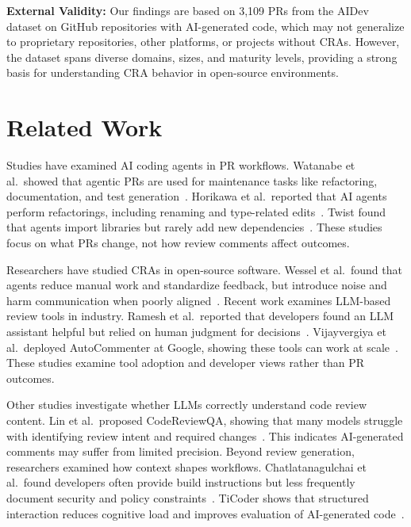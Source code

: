 \documentclass[sigconf]{acmart}
\begin{document}
\textbf{External Validity:} Our findings are based on 3,109 PRs from the AIDev dataset on GitHub repositories with AI-generated code, which may not generalize to proprietary repositories, other platforms, or projects without CRAs. However, the dataset spans diverse domains, sizes, and maturity levels, providing a strong basis for understanding CRA behavior in open-source environments.

\vspace{-4pt}
\section{Related Work}

Studies have examined AI coding agents in PR workflows. Watanabe et al.\ showed that agentic PRs are used for maintenance tasks like refactoring, documentation, and test generation~\cite{Watanabe_2025_AgenticPR}. Horikawa et al.\ reported that AI agents perform refactorings, including renaming and type-related edits~\cite{Horikawa_2025_AgenticRefactoring}. Twist found that agents import libraries but rarely add new dependencies~\cite{Twist_2025_LibraryUsage}. These studies focus on what PRs change, not how review comments affect outcomes.

Researchers have studied CRAs in open-source software. Wessel et al.\ found that agents reduce manual work and standardize feedback, but introduce noise and harm communication when poorly aligned~\cite{Wessel_2020_BotsSurvey}. Recent work examines LLM-based review tools in industry. Ramesh et al.\ reported that developers found an LLM assistant helpful but relied on human judgment for decisions~\cite{Ramesh_2025_Ericsson}. Vijayvergiya et al.\ deployed AutoCommenter at Google, showing these tools can work at scale~\cite{Vijayvergiya_2024_AutoCommenter}. These studies examine tool adoption and developer views rather than PR outcomes.

Other studies investigate whether LLMs correctly understand code review content. Lin et al.\ proposed CodeReviewQA, showing that many models struggle with identifying review intent and required changes~\cite{Lin_2025_CodeReviewQA}. This indicates AI-generated comments may suffer from limited precision. Beyond review generation, researchers examined how context shapes workflows. Chatlatanagulchai et al.\ found developers often provide build instructions but less frequently document security and policy constraints~\cite{Chatlatanagulchai_2025_AgentREADMEs}. TiCoder shows that structured interaction reduces cognitive load and improves evaluation of AI-generated code~\cite{Fakhoury_2024_TiCoder}.
\end{document}
